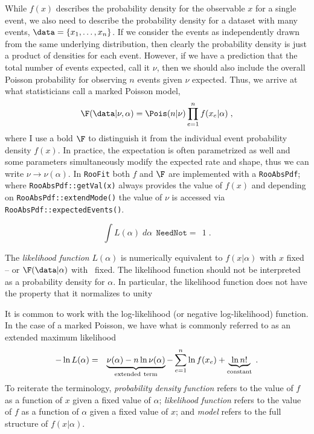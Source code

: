 While $f(x)$ describes the probability density for the observable $x$ for a single event, we also need to describe the probability density for a dataset with many events, $\data = \{x_1,\dots,x_{n}\}$.  If we consider the events as independently drawn from the same underlying distribution, then clearly the probability density is just a product of densities for each event.  However, if we have  a prediction that the total number of events expected, call it $\nu$, then we should also include the overall Poisson probability for observing $n$ events given $\nu$ expected.  Thus, we arrive at what statisticians call a marked Poisson model,
\begin{equation}\label{eqn:markedPoisson}
\F(\data|\nu,\alpha) = \Pois(n|\nu) \prod_{e=1}^n f(x_e|\alpha) \; ,
\end{equation}
where I use a bold $\F$ to distinguish it from the individual event probability density $f(x)$.  In practice, the expectation is often parametrized as well and some parameters simultaneously modify the expected rate and shape, thus we can write $\nu\rightarrow\nu(\alpha)$.  In \texttt{RooFit} both $f$ and $\F$ are implemented with a \texttt{RooAbsPdf}; where \texttt{RooAbsPdf::getVal(x)} always provides the value of $f(x)$ and depending on \texttt{RooAbsPdf::extendMode()} the value of $\nu$ is accessed via \texttt{RooAbsPdf::expectedEvents()}.


\begin{equation}
{\int L(\alpha) \;d\alpha ~~\mathtt{ Need Not =}~~ 1}\; .
\end{equation}


The \emph{likelihood function} $L(\alpha)$ is numerically equivalent to $f(x|\alpha)$ with $x$ fixed -- or $\F(\data|\alpha)$ with \data\ fixed.  The likelihood function should not be interpreted as a probability density for $\alpha$.  In particular, the likelihood function does not have the property that it normalizes to unity


It is common to work with the log-likelihood (or negative log-likelihood) function.  In the case of a marked Poisson, we have what is commonly referred to as an extended maximum likelihood~\cite{Barlow1990496}
\begin{eqnarray}
-\ln L( \alpha) &=& \underbrace{\nu(\alpha) - n \ln \nu(\alpha)}_{\rm extended~term} - \sum_{e=1}^n \ln f(x_e)   + \underbrace{~\ln n! ~}_{\mathrm{constant}}\; .
\end{eqnarray}
To reiterate the terminology, \emph{probability density function} refers to the value of $f$ as a function of $x$ given a fixed value of $\alpha$; \emph{likelihood function} refers to the value of $f$ as a function of $\alpha$ given a fixed value of $x$; and \emph{model} refers to the full structure of $f(x|\alpha)$.


